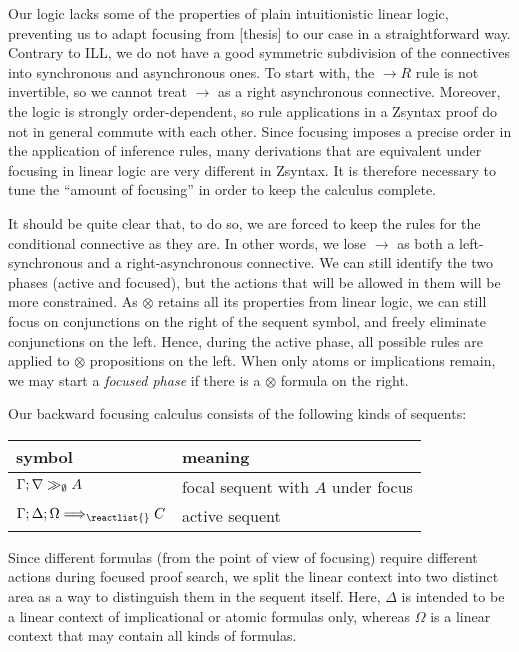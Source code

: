 Our logic lacks some of the properties of plain intuitionistic linear logic,
preventing us to adapt focusing from [thesis] to our case in a straightforward
way. Contrary to ILL, we do not have a good symmetric subdivision of the
connectives into synchronous and asynchronous ones. To start with, the
$\rightarrow R$ rule is not invertible, so we cannot treat $\rightarrow$ as a
right asynchronous connective. Moreover, the logic is strongly order-dependent,
so rule applications in a Zsyntax proof do not in general commute with each
other. Since focusing imposes a precise order in the application of inference
rules, many derivations that are equivalent under focusing in linear logic are
very different in Zsyntax. It is therefore necessary to tune the ``amount of
focusing'' in order to keep the calculus complete.

It should be quite clear that, to do so, we are forced to keep the rules for the
conditional connective as they are. In other words, we lose $\rightarrow$ as
both a left-synchronous and a right-asynchronous connective. We can still
identify the two phases (active and focused), but the actions that will be
allowed in them will be more constrained. As $\otimes$ retains all its
properties from linear logic, we can still focus on conjunctions on the right of
the sequent symbol, and freely eliminate conjunctions on the left. Hence, during
the active phase, all possible rules are applied to $\otimes$ propositions on
the left. When only atoms or implications remain, we may start a \emph{focused
  phase} if there is a $\otimes$ formula on the right.

Our backward focusing calculus consists of the following kinds of sequents:

\begin{table}[h]
  \centering
  \begin{tabular}{|l|l|}
    \hline
    \textbf{symbol} & \textbf{meaning} \\
    \hline
    $\Gamma; \nabla \gg_{\emptyset} A$ & focal sequent with $A$ under focus \\
    $\ztriseq{\Gamma}{\Delta}{\Omega}{\reactlist{}}{C}$ & active sequent \\
    \hline
  \end{tabular}
\end{table}

Since different formulas (from the point of view of focusing) require different
actions during focused proof search, we split the linear context into two
distinct area as a way to distinguish them in the sequent itself. Here, $\Delta$
is intended to be a linear context of implicational or atomic formulas only,
whereas $\Omega$ is a linear context that may contain all kinds of formulas.

